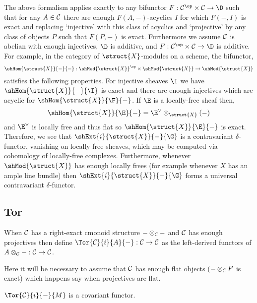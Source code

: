 \documentclass[12pt]{article}
\begin{document}
\begin{rmk}
The above formalism applies exactly to any bifunctor $F : \C^\op \times \C \to \D$ such that for any $A \in \mathcal{C}$ there are enough $F(A, -)$-acyclics $I$ for which $F(-,I)$ is exact and replacing `injective' with this class of acyclics and `projective' by any class of objects $P$ such that $F(P, -)$ is exact. Furthermore we assume $\mathcal{C}$ is abelian with enough injectives, $\D$ is additive, and $F : \C^\op \times \C \to \D$ is additive. 
\bigskip\\
For example, in the category of $\struct{X}$-modules on a scheme, the bifunctor,
\[ \shHom{\struct{X}}{-}{-} : \shMod{\struct{X}}^\op \times \shMod{\struct{X}} \to \shMod{\struct{X}} \] satisfies the following properties. For injective sheaves $\I$ we have $\shHom{\struct{X}}{-}{\I}$ is exact and there are enough injectives which are  acyclic for $\shHom{\struct{X}}{\F}{-}$. If $\E$ is a locally-free sheaf then,
\[ \shHom{\struct{X}}{\E}{-} = \E^\vee \otimes_{\struct{X}} (-) \]
and $\E^\vee$ is locally free and thus flat so $\shHom{\struct{X}}{\E}{-}$ is exact. Therefore, we see that $\shExt{i}{\struct{X}}{-}{\G}$ is a contravariant $\delta$-functor, vanishing on locally free sheaves, which may be computed via cohomology of locally-free complexes. Furthermore, whenever $\shMod{\struct{X}}$ has enough locally frees (for example whenever $X$ has an ample line bundle) then $\shExt{i}{\struct{X}}{-}{\G}$ forms a universal contravariant $\delta$-functor.
\end{rmk}

\subsection{Tor}

\begin{defn}
When $\mathcal{C}$ has a right-exact cmonoid structure $- \otimes_{\mathcal{C}} -$ and $\mathcal{C}$ has enough projectives then define $\Tor{\C}{i}{A}{-} : \C \to \C$ as the left-derived functors of $A \otimes_{\mathcal{C}} - : \mathcal{C} \to \mathcal{C}$. 
\end{defn}

\begin{rmk}
Here it will be necessary to assume that $\mathcal{C}$ has enough flat objects ($- \otimes_{\mathcal{C}} F$ is exact) which happens say when projectives are flat. 
\end{rmk}

\begin{lemma}
$\Tor{\C}{i}{-}{M}$ is a covariant functor.
\end{lemma}
\end{document}
